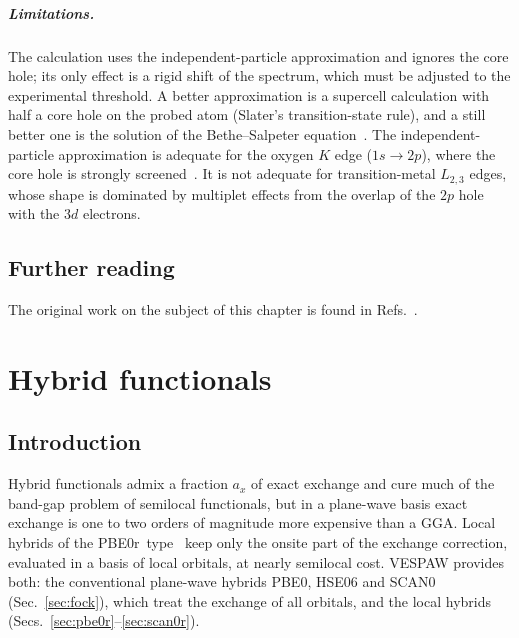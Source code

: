 \documentclass[11pt,a4paper,oneside]{book}
\newcommand{\pbezero}{PBE0r}
\begin{document}
\paragraph{Limitations.} The calculation uses the independent-particle
approximation and ignores the core hole; its only effect is a rigid
shift of the spectrum, which must be adjusted to the experimental
threshold. A better approximation is a supercell calculation with half
a core hole on the probed atom (Slater's transition-state rule), and a
still better one is the solution of the Bethe--Salpeter
equation~\cite{laskowski10_prb82_205104}. The independent-particle
approximation is adequate for the oxygen $K$ edge ($1s\to2p$), where the
core hole is strongly screened~\cite{davoli86_prb33_2979}. It is not
adequate for transition-metal $L_{2,3}$ edges, whose shape is dominated
by multiplet effects from the overlap of the $2p$ hole with the $3d$
electrons.


\section*{Further reading}
The original work on the subject of this chapter is found in
Refs.~\cite{bloechl94_prb50_17953,KresseJoubert1999,koelling77_jpc10_3107,egerton07_ultramicroscopy107_565}.

\chapter{Hybrid functionals}\label{chap:hybrids}
\minitoc
\section{Introduction}

Hybrid functionals admix a fraction $a_x$ of exact exchange and cure
much of the band-gap problem of semilocal functionals, but in a
plane-wave basis exact exchange is one to two orders of magnitude more
expensive than a GGA. Local hybrids of the \pbezero\
type~\cite{bloechl11_prb84_205101,sotoudeh17_prb95_235150} keep only the
onsite part of the exchange correction, evaluated in a basis of local
orbitals, at nearly semilocal cost. VESPAW provides both: the
conventional plane-wave hybrids PBE0, HSE06 and SCAN0
(Sec.~\ref{sec:fock}), which treat the exchange of all orbitals, and
the local hybrids (Secs.~\ref{sec:pbe0r}--\ref{sec:scan0r}).
\end{document}
